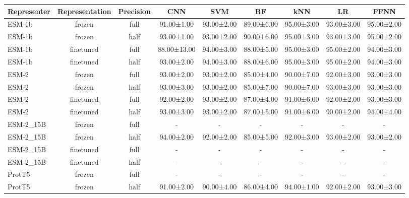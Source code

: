 \begin{tabular}{lcccccccc}
\toprule
 \textbf{Representer} & \textbf{Representation} & \textbf{Precision} &         \textbf{CNN} &        \textbf{SVM} &         \textbf{RF} &        \textbf{kNN} &         \textbf{LR} &       \textbf{FFNN} \\
\midrule
      ESM-1b &         frozen &      full &  91.00±1.00 & 93.00±2.00 & 89.00±6.00 & 95.00±3.00 & 93.00±3.00 & 95.00±2.00 \\
      ESM-1b &         frozen &      half &  93.00±1.00 & 93.00±2.00 & 90.00±6.00 & 95.00±3.00 & 93.00±3.00 & 95.00±2.00 \\
      ESM-1b &      finetuned &      full & 88.00±13.00 & 94.00±3.00 & 88.00±5.00 & 95.00±3.00 & 95.00±2.00 & 94.00±3.00 \\
      ESM-1b &      finetuned &      half &  93.00±2.00 & 94.00±3.00 & 88.00±6.00 & 95.00±3.00 & 95.00±2.00 & 94.00±3.00 \\
       ESM-2 &         frozen &      full &  93.00±2.00 & 93.00±2.00 & 85.00±4.00 & 90.00±7.00 & 92.00±3.00 & 93.00±3.00 \\
       ESM-2 &         frozen &      half &  93.00±3.00 & 93.00±2.00 & 85.00±7.00 & 90.00±7.00 & 93.00±3.00 & 93.00±3.00 \\
       ESM-2 &      finetuned &      full &  92.00±2.00 & 93.00±2.00 & 87.00±4.00 & 91.00±6.00 & 92.00±2.00 & 93.00±3.00 \\
       ESM-2 &      finetuned &      half &  93.00±3.00 & 93.00±2.00 & 87.00±5.00 & 91.00±6.00 & 90.00±2.00 & 94.00±4.00 \\
   ESM-2\_15B &         frozen &      full &           - &          - &          - &          - &          - &          - \\
   ESM-2\_15B &         frozen &      half &  94.00±2.00 & 92.00±2.00 & 85.00±5.00 & 92.00±3.00 & 93.00±2.00 & 93.00±2.00 \\
   ESM-2\_15B &      finetuned &      full &           - &          - &          - &          - &          - &          - \\
   ESM-2\_15B &      finetuned &      half &           - &          - &          - &          - &          - &          - \\
      ProtT5 &         frozen &      full &           - &          - &          - &          - &          - &          - \\
      ProtT5 &         frozen &      half &  91.00±2.00 & 90.00±4.00 & 86.00±4.00 & 94.00±1.00 & 92.00±2.00 & 93.00±3.00 \\

\end{tabular}
